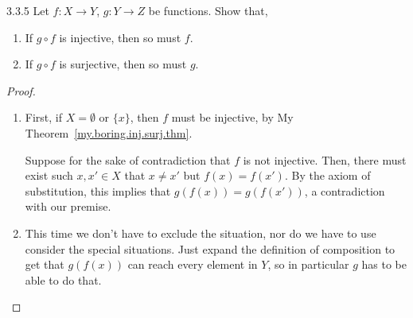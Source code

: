 \begin{exercise}{3.3.5}
	Let $f: X \to Y$, $g: Y \to Z$ be functions. Show that,
	\begin{enumerate}
		\item If $g \circ f$ is injective, then so must $f$.
		\item If $g \circ f$ is surjective, then so must $g$.
	\end{enumerate}
\end{exercise}
\begin{proof}\leavevmode
	\begin{enumerate}
		\item First, if $X = \emptyset$ or $\{x\}$, then $f$ must be injective, by My Theorem~\ref{my.boring.inj.surj.thm}.
		
		Suppose for the sake of contradiction that $f$ is not injective. Then, there must exist such $x,x' \in X$ that $x \ne x'$ but $f(x) = f(x')$. By the axiom of substitution, this implies that $g(f(x)) = g(f(x'))$, a contradiction with our premise.
		
		\item This time we don't have to exclude the situation, nor do we have to use consider the special situations. Just expand the definition of composition to get that $g(f(x))$ can reach every element in $Y$, so in particular $g$ has to be able to do that.
	\end{enumerate}
\end{proof}


